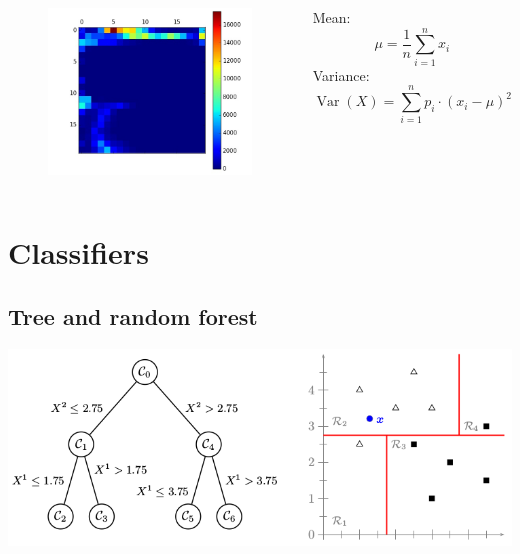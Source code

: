 \documentclass[aspectratio=169]{beamer}
\let\oldsection\section
\renewcommand{\section}[1]{
    \oldsection{#1}	
    \subsection{}
}
\newenvironment{myframe}[1][t]{\begin{frame}[#1]{\secname}{\subsecname}}{\end{frame}}
\begin{document}
    \begin{myframe}
        \vspace{-0.5cm}
        \begin{columns}
            \centering
            \begin{figure}[h]
                \includegraphics[scale=0.35]{../img/joint_histogram}
            \end{figure}
            
            \centering
            Mean:
            $$ \mu = \frac{1}{n} \sum_{i = 1}^{n} x_i $$
            Variance:
            $$ \operatorname {Var} (X)=\sum _{i=1}^{n}p_{i}\cdot (x_{i}-\mu )^{2} $$
        \end{columns}
    \end{myframe}
    
    \section{Classifiers}
    
    \subsection{Tree and random forest}
    
    \begin{myframe}
        \begin{center}
            \includegraphics[scale=0.50]{../img/decision_tree_simple_example}
        \end{center}
    \end{myframe}
    
\end{document}
